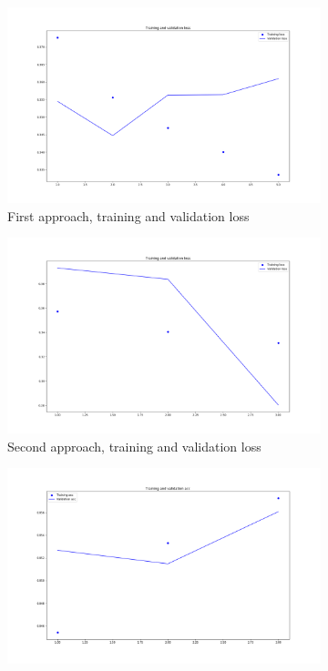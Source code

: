 \documentclass{amia}
\begin{document}
\begin{figure}
\begin{subfigure}{0.33\linewidth}
	\centering
	\includegraphics[width=\linewidth]{train_val_loss_plot.png}
	\caption{First approach, training and validation loss}  \label{fig:a}
\end{subfigure}
\begin{subfigure}{0.33\linewidth}
	\centering
	\includegraphics[width=\linewidth]{chexpert_keras_tf_to_full_loss.png}
	\caption{Second approach, training and validation loss}  \label{fig:b}
\end{subfigure}
\begin{subfigure}{0.33\linewidth}
	\centering
	\includegraphics[width=\linewidth]{chexpert121_acc_tf_to_full.png}

\end{subfigure}
\end{figure}
\end{document}
